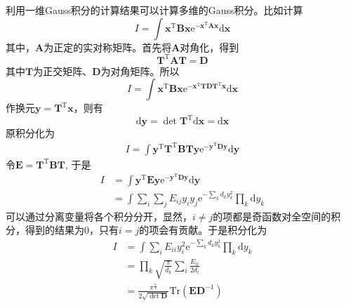 \documentclass[12pt]{article}
\begin{document}
    利用一维Gauss积分的计算结果可以计算多维的Gauss积分。比如计算
    \begin{equation}
        I = \int \bm{x}^\mathrm{T}\bm{Bx} \mathrm{e}^{-\bm{x}^\mathrm{T}\bm{Ax}}\mathrm{d}\bm{x}
    \end{equation}
    其中，$\bm{A}$为正定的实对称矩阵。首先将$\bm{A}$对角化，得到
    \begin{equation}
        \bm{T}^\mathrm{T} \bm{AT} = \bm{D}
    \end{equation}
    其中$\bm{T}$为正交矩阵、$\bm{D}$为对角矩阵。所以
    \begin{equation}
        I = \int \bm{x}^\mathrm{T}\bm{Bx} \mathrm{e}^{-\bm{x}^\mathrm{T}\bm{TDT}^\mathrm{T}\bm{x}}\mathrm{d}\bm{x}
    \end{equation}
    作换元$\bm{y} = \bm{T}^\mathrm{T}\bm{x}$，则有
    \begin{equation}
        \mathrm{d}\bm{y} = \det \bm{T}^\mathrm{T}\mathrm{d}\bm{x} = \mathrm{d}\bm{x}
    \end{equation}
    原积分化为
    \begin{equation}\begin{aligned}
        I = \int \bm{y}^\mathrm{T}\bm{T}^\mathrm{T}\bm{BTy} \mathrm{e}^{-\bm{y}^\mathrm{T}\bm{D}\bm{y}}\mathrm{d}\bm{y}
    \end{aligned}\end{equation}
    令$\bm{E = T}^\mathrm{T}\bm{BT}$, 于是
    \begin{equation}\begin{aligned}
        I &= \int \bm{y}^\mathrm{T}\bm{Ey} \mathrm{e}^{-\bm{y}^\mathrm{T}\bm{D}\bm{y}}\mathrm{d}\bm{y}\\
        &= \int \sum_i \sum_j E_{ij} y_i y_j \mathrm{e}^{-\sum_k d_k y_k^2} \prod_k \mathrm{d}y_k
    \end{aligned}\end{equation}
    可以通过分离变量将各个积分分开，显然，$i \neq j$的项都是奇函数对全空间的积分，得到的结果为0，只有$i=j$的项会有贡献。于是积分化为
    \begin{equation}\begin{aligned}
        I &= \int \sum_i E_{ii} y_i^2 \mathrm{e}^{-\sum_k d_k y_k^2} \prod_k \mathrm{d}y_k\\
        &= \prod_k \sqrt{\frac {\pi}{d_k}} \sum_i \frac {E_{ii}}{2d_i}\\
        &= \frac {\pi^{\frac n2}}{2\sqrt{\det{\bm{D}}}} \mathrm{Tr} (\bm{ED}^{-1})
    \end{aligned}\end{equation}
\end{document}
